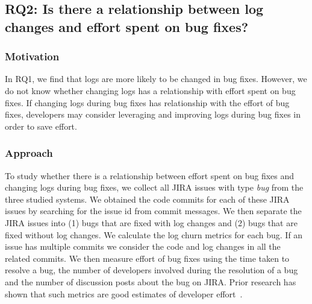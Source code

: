 \subsection*{RQ2: Is there a relationship between log changes and effort spent on bug fixes?}


\subsubsection*{Motivation}

In RQ1, we find that logs are more likely to be changed in bug fixes. However, we do not know whether changing logs has a relationship with effort spent on bug fixes. If changing logs during bug fixes has relationship with the effort of bug fixes, developers may consider leveraging and improving logs during bug fixes in order to save effort.

\subsubsection*{Approach}



To study whether there is a relationship between effort spent on bug fixes and changing logs during bug fixes, we collect all JIRA issues with type \emph{bug} from the three studied systems. We obtained the code commits for each of these JIRA issues by searching for the issue id from commit messages. We then separate the JIRA issues into (1) bugs that are fixed with log changes and (2) bugs that are fixed without log changes. We calculate the log churn metrics for each bug. If an issue has multiple commits we consider the code and log changes in all the related commits. We then measure effort of bug fixes using the time taken to resolve a bug, the number of developers involved during the resolution of a bug and the number of discussion posts about the bug on JIRA. Prior research has shown that such metrics are good estimates of developer effort~\cite{amor2006effort}. 

